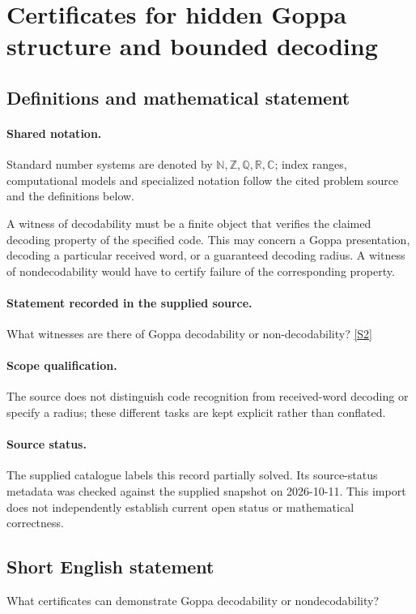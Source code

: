\documentclass[11pt]{article}
\newcommand{\sref}[2]{\hyperlink{source:#1:#2}{[S#2]}}
\begin{document}
\section{Certificates for hidden Goppa structure and bounded decoding}\label{statement}

\subsection{Definitions and mathematical statement}

\paragraph{Shared notation.}Standard number systems are denoted by $\mathbb N,\mathbb Z,\mathbb Q,\mathbb R,\mathbb C$; index ranges, computational models and specialized notation follow the cited problem source and the definitions below.


A witness of decodability must be a finite object that verifies the claimed decoding property of the specified code. This may concern a Goppa presentation, decoding a particular received word, or a guaranteed decoding radius. A witness of nondecodability would have to certify failure of the corresponding property.
\paragraph{Statement recorded in the supplied source.}
What witnesses are there of Goppa decodability or non-decodability? \sref{statement}{2}
\paragraph{Scope qualification.}
The source does not distinguish code recognition from received-word decoding or specify a radius; these different tasks are kept explicit rather than conflated.
\paragraph{Source status.}
The supplied catalogue labels this record partially solved. Its source-status metadata was checked against the supplied snapshot on 2026-10-11. This import does not independently establish current open status or mathematical correctness.
\subsection{Short English statement}
What certificates can demonstrate Goppa decodability or nondecodability?
\end{document}
